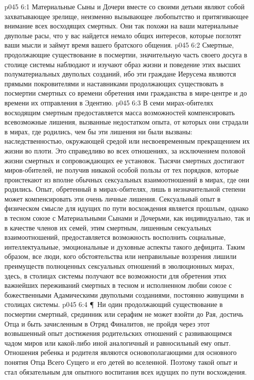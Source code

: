 \vs p045 6:1 Материальные Сыны и Дочери вместе со своими детьми являют собой захватывающее зрелище, неизменно вызывающее любопытство и притягивающее внимание всех восходящих смертных. Они так похожи на ваши материальные двуполые расы, что у вас найдется немало общих интересов, которые поглотят ваши мысли и займут время вашего братского общения.
\vs p045 6:2 Смертные, продолжающие существование в посмертии, значительную часть своего досуга в столице системы наблюдают и изучают образ жизни и поведение этих высших полуматериальных двуполых созданий, ибо эти граждане Иерусема являются прямыми покровителями и наставниками продолжающих существовать в посмертии смертных со времени обретения ими гражданства в мире\hyp{}центре и до времени их отправления в Эдентию.
\vs p045 6:3 В семи мирах\hyp{}обителях восходящим смертным предоставляется масса возможностей компенсировать всевозможные лишения, вызванные недостатком опыта, от которых они страдали в мирах, где родились, чем бы эти лишения ни были вызваны: наследственностью, окружающей средой или несвоевременным прекращением их жизни во плоти. Это справедливо во всех отношениях, за исключением половой жизни смертных и сопровождающих ее установок. Тысячи смертных достигают миров\hyp{}обителей, не получив никакой особой пользы от тех порядков, которые проистекают из вполне обычных сексуальных взаимоотношений в мирах, где они родились. Опыт, обретенный в мирах\hyp{}обителях, лишь в незначительной степени может компенсировать эти очень личные лишения. Сексуальный опыт в физическом смысле для идущих по пути восхождения является прошлым, однако в тесном союзе с Материальными Сынами и Дочерьми, как индивидуально, так и в качестве членов их семей, этим смертным, лишенным сексуальных взаимоотношений, предоставляется возможность восполнить социальные, интеллектуальные, эмоциональные и духовные аспекты такого дефицита. Таким образом, все люди, кого обстоятельства или неправильные воззрения лишили преимуществ полноценных сексуальных отношений в эволюционных мирах, здесь, в столицах системы получают все возможности для обретения этих важнейших переживаний смертных в тесном и исполненном любви союзе с божественными Адамическими двуполыми созданиями, постоянно живущими в столицах системы.
\vs p045 6:4 \P\ Ни один продолжающий существование в посмертии смертный, срединник или серафим не может взойти до Рая, достичь Отца и быть зачисленным в Отряд Финалитов, не пройдя через этот возвышенный опыт достижения родительских отношений с развивающимся чадом миров или какой\hyp{}либо иной аналогичный и равносильный ему опыт. Отношения ребенка и родителя являются основополагающими для основного понятия Отца Всего Сущего и его детей во вселенной. Поэтому такой опыт и стал обязательным для опытного воспитания всех идущих по пути восхождения.
